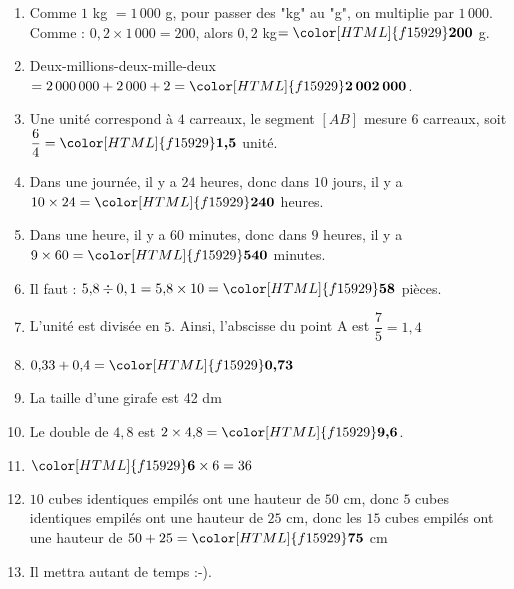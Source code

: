 \begin{Correction}
\begin{EXO}{}{}
\begin{enumerate}[itemsep=1em, label=\arabic*)]
\item  Comme $1$ kg $=1\,000$ g,  pour passer des "kg" au "g", on multiplie par $1\,000$.\\
			Comme : $0{,}2\times 1\,000 =200$, alors $0{,}2$ kg$={\color[HTML]{f15929}\boldsymbol{200}}$ g.
\item Deux-millions-deux-mille-deux $=2\,000\,000  + 2\,000 + 2={\color[HTML]{f15929}\boldsymbol{2\,002\,000}}$. 
\item Une unité correspond à $4$ carreaux, le segment $[AB]$ mesure $6$ carreaux, soit $\dfrac{6}{4}={\color[HTML]{f15929}\boldsymbol{1{,}5}}$ unité. 
\item Dans une journée, il y a $24$ heures, donc dans $10$ jours, il y a $10\times 24={\color[HTML]{f15929}\boldsymbol{240}}$ heures.
\item Dans une heure, il y a $60$ minutes, donc dans $9$ heures, il y a $9\times 60={\color[HTML]{f15929}\boldsymbol{540}}$ minutes.
\item Il faut : $5{,}8\div 0,1=5{,}8\times 10={\color[HTML]{f15929}\boldsymbol{58}}$ pièces.
\item L'unité est divisée en $5$. Ainsi, l'abscisse du point A est $\dfrac{7}{5}=1{,}4$
\item  $0{,}33+0{,}4={\color[HTML]{f15929}\boldsymbol{0{,}73}}$
\item La taille d'une girafe est 42 dm
\item Le double de $4{,}8$ est $2\times 4{,}8={\color[HTML]{f15929}\boldsymbol{9{,}6}}$.
\item $ {\color[HTML]{f15929}\boldsymbol{6}} \times 6=36$
\item $10$ cubes identiques empilés ont une hauteur de $50$ cm, donc $5$ cubes identiques empilés ont une hauteur de $25$ cm, donc les
		  $15$ cubes empilés ont une hauteur de $50+25={\color[HTML]{f15929}\boldsymbol{75}}$ cm 
\item Il mettra autant de temps :-). 
\end{enumerate}

\end{EXO}

\begin{EXO}{}{}


\end{EXO}
\end{Correction}
